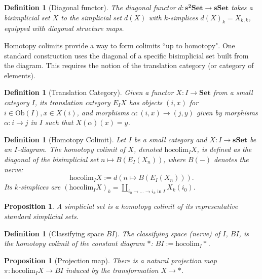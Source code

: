 \documentclass[12pt]{report}
\numberwithin{equation}{section}
\newtheorem{definition}[dummy]{Definition}
\newtheorem{proposition}[dummy]{Proposition}
\begin{document}
	\begin{definition}[Diagonal functor]
		The diagonal functor $d: \mathbf{s^2Set} \to \mathbf{sSet}$ takes a bisimplicial set $X$ to the simplicial set $d(X)$ with $k$-simplices $d(X)_k = X_{k,k}$, equipped with diagonal structure maps.
	\end{definition}
	
	Homotopy colimits provide a way to form colimits ``up to homotopy". One standard construction uses the diagonal of a specific bisimplicial set built from the diagram. This requires the notion of the translation category (or category of elements).
	
	\begin{definition}[Translation Category]
		Given a functor $X: I \to \mathbf{Set}$ from a small category $I$, its translation category $E_I X$ has objects $(i, x)$ for $i \in \mathrm{Ob}(I), x \in X(i)$, and morphisms $\alpha: (i, x) \to (j, y)$ given by morphisms $\alpha: i \to j$ in $I$ such that $X(\alpha)(x) = y$.
	\end{definition}
	
	\begin{definition}[Homotopy Colimit]\label{def:homotopycolimit}
		Let $I$ be a small category and $X: I \to \mathbf{sSet}$ be an $I$-diagram. The homotopy colimit of $X$, denoted $\mathrm{hocolim}_{I} X$, is defined as the diagonal of the bisimplicial set $n \mapsto B(E_I(X_n))$, where $B(-)$ denotes the nerve:
		\[ \mathrm{hocolim}_{I} X := d( n \mapsto B(E_I(X_n)) ). \]
		Its $k$-simplices are $(\mathrm{hocolim}_{I} X)_k = \coprod_{i_0 \to \dots \to i_k \text{ in } I} X_k(i_0)$.
	\end{definition}
	
	\begin{proposition}
		A simplicial set is a homotopy colimit of its representative standard simplicial sets.
	\end{proposition}
	
	\begin{definition}[Classifying space $BI$]
		The classifying space (nerve) of $I$, $BI$, is the homotopy colimit of the constant diagram $*$: $BI := \mathrm{hocolim}_{I} *$.
	\end{definition}
	
	\begin{proposition}[Projection map]
		There is a natural projection map $\pi: \mathrm{hocolim}_{I} X \to BI$ induced by the transformation $X \to *$.
	\end{proposition}
	
\end{document}
